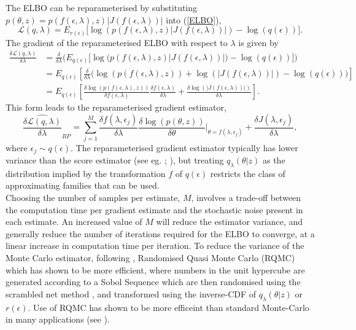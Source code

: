 \documentclass[12pt,a4paper]{article}\usepackage[]{graphicx}\usepackage[]{color}
\begin{document}
The ELBO can be reparameterised by substituting $p(\theta, z) = p(f(\epsilon, \lambda), z)|J(f(\epsilon, \lambda))|$ into (\ref{ELBO}),
\begin{equation}
\label{rpELBO}
\mathcal{L}(q, \lambda) = E_{r(\epsilon)} \bigg[\log(p(f(\epsilon,\lambda), z)|J(f(\epsilon, \lambda))|) - \log(q(\epsilon))\bigg].
\end{equation}
The gradient of the reparameterised ELBO with respect to $\lambda$ is given by 
\begin{align}
\label{rpELBODeriv}
\frac{\delta\mathcal{L}(q, \lambda)}{\delta \lambda} &= \frac{\delta}{\delta \lambda} \bigg( E_{q(\epsilon)} \bigg[\log\big(p(f(\epsilon,\lambda), z)|J(f(\epsilon, \lambda))|\big) - \log(q(\epsilon))\bigg] \bigg) \nonumber \\
&= E_{q(\epsilon)} \left[ \frac{\delta}{\delta \lambda} \bigg(\log(p(f(\epsilon,\lambda), z)) + \log(|J(f(\epsilon, \lambda))|) - \log(q(\epsilon)) \bigg)\right] \nonumber \\
&= E_{q(\epsilon)} \left[ \frac{\delta \log(p(f(\epsilon,\lambda), z))}{\delta f(\epsilon,\lambda)} \frac{\delta f(\epsilon,\lambda)}{\delta \lambda}  + \frac{\delta \log(|J(f(\epsilon, \lambda))|)}{\delta \lambda} \right].
\end{align}
This form leads to the reparameterised gradient estimator,
\begin{equation}
\label{rpDeriv}
\widehat{\frac{\delta\mathcal{L}(q, \lambda)}{\delta \lambda}}_{RP} = \sum_{j = 1}^M \frac{\delta f(\lambda, \epsilon_j)}{\delta \lambda} \frac{\delta \log(p(\theta, z))}{\delta \theta} \bigg\rvert_{\theta = f(\lambda, \epsilon_j)} + \frac{\delta J(\lambda, \epsilon_j)}{\delta \lambda}, 
\end{equation}
where $\epsilon_j \sim q(\epsilon)$. The reparameterised gradient estimator typically has lower variance than the score estimator (see eg. \cite{Rezende2014}; \cite{Ruiz2016}), but treating $q_{\lambda}(\theta | z)$ as the distribution implied by the transformation $f$ of $q(\epsilon)$ restricts the class of approximating families that can be used.
\\

Choosing the number of samples per estimate, $M$, involves a trade-off between the computation time per gradient estimate and the stochastic noise present in each estimate. An increased value of $M$ will reduce the estimator variance, and generally reduce the number of iterations required for the ELBO to converge, at a linear increase in computation time per iteration. To reduce the variance of the Monte Carlo estimator, following \citet{Gunawan2017}, Randomised Quasi Monte Carlo (RQMC) which has shown to be more efficient, where numbers in the unit hypercube are generated according to a Sobol Sequence \citep{Sobol1967} which are then randomised using the scrambled net method \citep{Matousek1998}, and transformed using the inverse-CDF of $q_{\lambda}(\theta | z)$ or $r(\epsilon)$. Use of RQMC has shown to be more efficeint than standard Monte-Carlo in many applications (see \cite{Niederreiter1992, Caflisch1998}).
\end{document}
